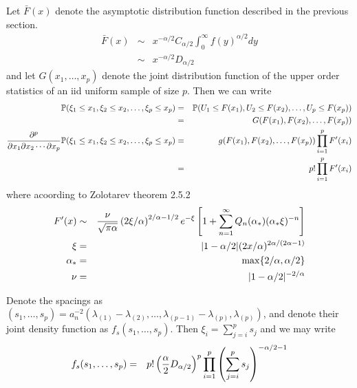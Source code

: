 \documentclass{article}
\begin{document}
Let $\bar{F}(x)$ denote the asymptotic distribution function described in the previous section.
\begin{eqnarray*}
  \bar{F}(x) &\sim& x^{-\alpha/2} C_{\alpha/2} \int_0^\infty f(y)^{\alpha/2} dy  \\
  &\sim& x^{-\alpha/2} D_{\alpha/2}
\end{eqnarray*}
and let $G(x_1, \dots, x_p)$ denote the joint distribution function of the upper order statistics of an iid
uniform sample of size $p$. Then we can write
\begin{eqnarray*}
\P(\xi_1 \leq x_1, \xi_2 \leq x_2, \dots, \xi_p \leq x_p) &=&
\P(U_1 \leq F(x_1), U_2 \leq F(x_2), \dots, U_p \leq F(x_p)) \\
  &=& G(F(x_1), F(x_2), \dots, F(x_p)) \\
\frac{\partial^p}{\partial x_1\partial x_2 \cdots \partial x_p}
\P(\xi_1 \leq x_1, \xi_2 \leq x_2, \dots, \xi_p \leq x_p) &=&
g(F(x_1), F(x_2), \dots, F(x_p)) \prod_{i=1}^p F'(x_i) \\
  &=& p! \prod_{i=1}^p F'(x_i)
\end{eqnarray*}
where acoording to Zolotarev \cite{Zolotarev1983} theorem 2.5.2
\begin{eqnarray*}
  F'(x) &\sim& {\nu \over \sqrt{\pi \alpha}} \left(2\xi/\alpha\right)^{2/\alpha - 1/2}
  e^{-\xi} \left[
    1 + \sum_{n=1}^\infty Q_n(\alpha_*) (\alpha_* \xi)^{-n}
  \right] \\
  \xi &=& |1 - \alpha/2|(2x/\alpha)^{2\alpha/(2\alpha-1)}\\
  \alpha_* &=& \max\{2/\alpha, \alpha/2\} \\
  \nu &=& |1 - \alpha/2|^{-2/\alpha}
\end{eqnarray*}

Denote the spacings as $(s_1, \dots, s_p) = a_n^{-2} (\lambda_{(1)} - \lambda_{(2)}, \dots,
\lambda_{(p-1)} - \lambda_{(p)}, \lambda_{(p)})$, and denote their joint density function as
$f_s(s_1, \dots, s_p)$. Then $\xi_i = \sum_{j=i}^p s_j$ and we may write
\begin{eqnarray*}
  f_s(s_1, \dots, s_p) &=& p! \left(
      {\alpha \over 2} D_{\alpha/2}
      \right)^p \prod_{i=1}^p \left(
                           \sum_{j=i}^p s_j
                           \right)^{-\alpha/2 - 1}
\end{eqnarray*}


\end{document}
